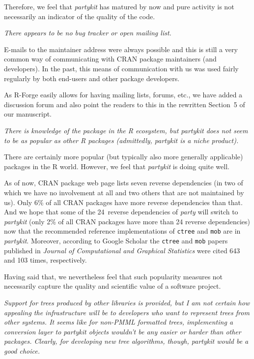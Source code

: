 \documentclass{article}
\begin{document}
Therefore, we feel that \emph{partykit} has matured by now and pure activity
is not necessarily an indicator of the quality of the code.

\medskip

\textit{%
There appears to be no bug tracker or open mailing list.
}

\smallskip

E-mails to the maintainer address were always possible and this is still a very common
way of communicating with CRAN package maintainers (and developers). In the past,
this means of communication with us was used fairly regularly by both end-users
and other package developers.

As \textsf{R}-Forge easily allows for having mailing lists, forums, etc., we
have added a discussion forum and also point the readers to this in the rewritten
Section~5 of our manuscript.

\medskip

\textit{%
There is knowledge of the package in the R ecosystem, but partykit does not seem
to be as popular as other R packages (admittedly, partykit is a niche product).
}

\smallskip

There are certainly more popular (but typically also more generally applicable) packages
in the \textsf{R} world. However, we feel that \emph{partykit} is doing quite
well. 

As of now, CRAN package web page lists seven reverse dependencies (in two of
which we have no involvement at all and two others that are not maintained by us).
Only 6\% of all CRAN packages have more reverse dependencies than that. And we hope
that some of the 24~reverse dependencies of \emph{party} will switch to \emph{partykit}
(only 2\% of all CRAN packages have more than 24 reverse dependencies) now that the
recommended reference implementations of \texttt{ctree} and \texttt{mob} are in \emph{partykit}.
Moreover, according to Google Scholar the \texttt{ctree} and \texttt{mob} papers
published in \emph{Journal of Computational and Graphical Statistics} were cited
643 and 103 times, respectively.

Having said that, we nevertheless feel that such popularity measures not necessarily
capture the quality and scientific value of a software project.

\medskip

\textit{%
Support for trees produced by other libraries is provided, but I am not
certain how appealing the infrastructure will be to developers who want to
represent trees from other systems.  It seems like for non-PMML formatted
trees, implementing a conversion layer to partykit objects wouldn't be any
easier or harder than other packages. Clearly, for developing new tree
algorithms, though, partykit would be a good choice.
}
\end{document}
